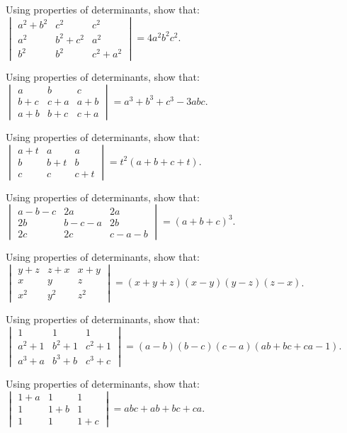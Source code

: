 \documentclass[11pt,a4paper]{article}
\begin{document}
\begin{longlist}
\item Using properties of determinants, show that: $\begin{vmatrix}a^2+b^2 & c^2 & c^2\\ a^2 & b^2+c^2 & a^2\\ b^2 & b^2 & c^2+a^2\end{vmatrix}=4a^2b^2c^2$.

\item Using properties of determinants, show that: $\begin{vmatrix}a & b & c\\ b+c & c+a & a+b\\ a+b & b+c & c+a\end{vmatrix}=a^3+b^3+c^3-3abc$.

\item Using properties of determinants, show that: $\begin{vmatrix}a+t & a & a\\ b & b+t & b\\ c & c & c+t\end{vmatrix}=t^2(a+b+c+t)$.

\item Using properties of determinants, show that: $\begin{vmatrix}a-b-c & 2a & 2a\\ 2b & b-c-a & 2b\\ 2c & 2c & c-a-b\end{vmatrix}=(a+b+c)^3$.

\item Using properties of determinants, show that: $\begin{vmatrix}y+z & z+x & x+y\\ x & y & z\\ x^2 & y^2 & z^2\end{vmatrix}=(x+y+z)(x-y)(y-z)(z-x)$.

\item Using properties of determinants, show that: $\begin{vmatrix}1 & 1 & 1\\ a^2+1 & b^2+1 & c^2+1\\ a^3+a & b^3+b & c^3+c\end{vmatrix}=(a-b)(b-c)(c-a)(ab+bc+ca-1)$.

\item Using properties of determinants, show that: $\begin{vmatrix}1+a & 1 & 1\\ 1 & 1+b & 1\\ 1 & 1 & 1+c\end{vmatrix}=abc+ab+bc+ca$.


\end{longlist}
\end{document}
